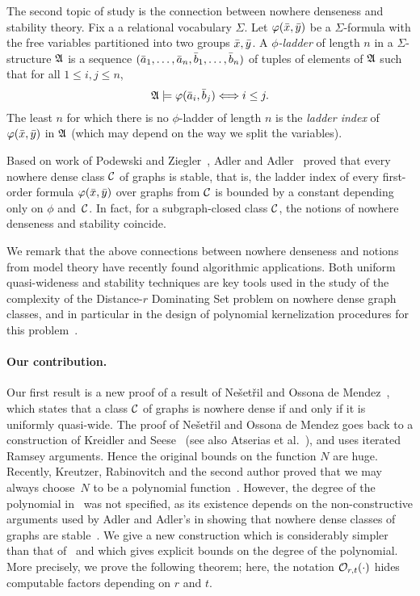 The second topic of study is the
connection between nowhere denseness and stability theory. 
Fix a 
 a relational vocabulary $\Sigma$. Let 
$\varphi(\bar{x},\bar{y})$ be a $\Sigma$-formula with the free variables
partitioned into two groups $\bar{x}, \bar{y}$. A \emph{$\phi$-ladder}
of length $n$ in a $\Sigma$-structure $\mathfrak A$ is a sequence $(\bar{a}_1,\ldots, \bar{a}_{n},
\bar{b}_1,\ldots, \bar{b}_{n})$ of tuples of elements of $\mathfrak A$ 
such that for all $1\leq i,j\le n$,
\[\mathfrak{A}\models\varphi(\bar{a}_i,\bar{b}_j)\Longleftrightarrow i\leq j. \]
The least  $n$ for which 
there is no $\phi$-ladder of length $n$ is 
the \emph{ladder index} 
of $\varphi(\bar{x},\bar{y})$ in $\mathfrak A$ (which may depend on the way we split the
variables). 

Based on work of Podewski and Ziegler~\cite{podewski1978stable}, 
Adler and Adler~\cite{adler2014interpreting}
proved that every nowhere dense class $\mathcal{C}$ of graphs is stable, that is, 
the ladder index of every first-order formula $\varphi(\bar{x},\bar{y})$ over
graphs from $\mathcal{C}$ is bounded by a constant depending only on $\phi$ 
and~$\mathcal{C}$. In fact, for a subgraph-closed class $\mathcal{C}$, the notions of nowhere denseness and stability coincide.

We remark that the above connections between nowhere denseness and notions from model theory have recently found algorithmic applications.
Both uniform quasi-wideness and stability techniques are key tools used in the study of the complexity of the {\sc Distance-$r$ Dominating Set} problem on nowhere dense graph classes,
and in particular in the design of polynomial kernelization procedures for this problem~\cite{DawarK09,drange2016kernelization,eickmeyer2016neighborhood,siebertz2016polynomial}.

\paragraph{Our contribution.} 
Our first result is  a new proof of a result of
Ne\v{s}et\v{r}il and Ossona de Mendez~\cite{nevsetvril2010first},
which states that a class $\mathcal{C}$ of graphs is nowhere dense if and only if it
is uniformly quasi-wide. The proof of Ne\v{s}et\v{r}il 
and Ossona de Mendez goes back to a construction
of Kreidler and Seese~\cite{kreidler1998monadic} (see also Atserias et al.~\cite{atserias2006preservation}), 
and uses iterated Ramsey arguments. Hence the original bounds on 
the function $N$ are huge. Recently, Kreutzer, Rabinovitch and the second author
 proved that we may always choose~$N$ to be a polynomial 
function~\cite{siebertz2016polynomial}. However, the degree of the polynomial 
in~\cite{siebertz2016polynomial} was  not specified, as its existence 
depends on the non-constructive arguments used by Adler and Adler's in showing that nowhere dense classes of graphs
are stable~\cite{adler2014interpreting}. We give a new construction 
which is considerably simpler than that of~\cite{siebertz2016polynomial}
and which gives explicit bounds on the degree of the polynomial. 
More precisely, we prove the following theorem; here, the notation $\mathcal{O}_{r,t}(\cdot)$ hides computable factors depending on $r$ and $t$.

